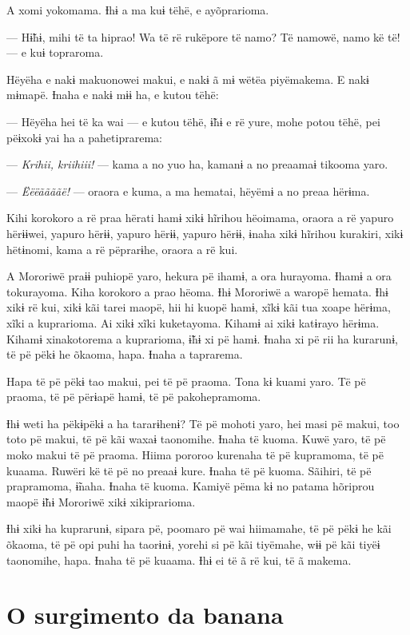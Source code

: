 A xomi yokomama. Ɨhɨ a ma kuɨ tëhë, e ayõprarioma. 

--- Hɨ̃hɨ, mihi të ta hiprao! Wa të rë rukëpore të namo? Të namowë, namo kë
të! --- e kuɨ topraroma. 

Hëyëha e nakɨ makuonowei makui, e nakɨ ã mɨ wëtëa piyëmakema. E nakɨ
mɨmapë. Ɨnaha e nakɨ mɨɨ ha, e kutou tëhë: 

--- Hëyëha hei të ka wai --- e kutou tëhë, ɨ̃hɨ e rë yure, mohe potou tëhë,
pei pëɨxokɨ yai ha a pahetiprarema:

--- \textit{Krihii, kriihiii!} --- kama a no yuo ha, kamanɨ a no preaamaɨ tikooma
yaro. 

--- \textit{Ëëëããããë!} --- oraora e kuma, a ma hematai, hëyëmɨ a no preaa hërɨma. 

Kihi korokoro a rë praa hërati hamɨ xikɨ hĩrihou hëoimama, oraora a rë
yapuro hërɨɨwei, yapuro hërɨɨ, yapuro hërɨɨ, yapuro hërɨɨ, ɨnaha xikɨ
hĩrihou kurakiri, xikɨ hëtɨnomi, kama a rë pëprarɨhe, oraora a rë kui. 

A Mororiwë praɨɨ puhiopë yaro, hekura pë ihamɨ, a ora hurayoma. Ɨhamɨ a
ora tokurayoma. Kiha korokoro a prao hëoma. Ɨhɨ Mororiwë a waropë
hemata. Ɨhɨ xikɨ rë kui, xikɨ kãi tarei maopë, hii hi kuopë hamɨ, xĩkɨ
kãi tua xoape hërɨma, xĩki a kuprarioma. Ai xikɨ xĩki kuketayoma. Kihamɨ
ai xikɨ katɨrayo hërɨma. Kihamɨ xinakotorema a kuprarioma, ɨ̃hɨ xi pë
hamɨ. Ɨnaha xi pë rii ha kurarunɨ, të pë pëkɨ he õkaoma, hapa. Ɨnaha a
taprarema. 

Hapa të pë pëkɨ tao makui, pei të pë praoma. Tona kɨ kuami yaro. Të pë
praoma, të pë përɨapë hamɨ, të pë pakohepramoma. 

Ɨhɨ weti ha pëkɨpëkɨ a ha tararɨhenɨ? Të pë mohoti yaro, hei masi pë
makui, too toto pë makui, të pë kãi waxaɨ taonomihe. Ɨnaha të kuoma.
Kuwë yaro, të pë moko makui të pë praoma. Hiima pororoo kurenaha të pë
kupramoma, të pë kuaama. Ruwëri kë të pë no preaaɨ kure. Ɨnaha të pë
kuoma. Sãihiri, të pë prapramoma, ɨ̃naha. Ɨnaha të kuoma. Kamiyë pëma kɨ
no patama hõriprou maopë ɨ̃hɨ Mororiwë xikɨ xikiprarioma. 

Ɨhɨ xikɨ ha kuprarunɨ, sipara pë, poomaro pë wai hiimamahe, të pë pëkɨ
he kãi õkaoma, të pë opi puhi ha taorɨnɨ, yorehi si pë kãi tiyëmahe, wɨɨ
pë kãi tiyëɨ taonomihe, hapa. Ɨnaha të pë kuaama. Ɨhɨ ei të ã rë kui, të
ã makema.

\chapter{O surgimento da banana}
 
